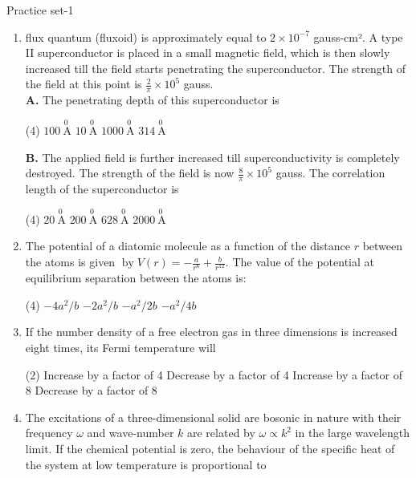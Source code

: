 \newpage
\begin{abox}
	Practice set-1
	\end{abox}
\begin{enumerate}
	\item flux quantum (fluxoid) is approximately equal to $2 \times 10^{-7}$ gauss-cm². A type II superconductor is placed in a small magnetic field, which is then slowly increased till the field starts penetrating the superconductor. The strength of the field at this point is $\frac{2}{\pi} \times 10^{5}$ gauss.\\
	\textbf{A. }The penetrating depth of this superconductor is
{	}
\begin{tasks}(4)
\task[\textbf{A.}] $100 \stackrel{0}{\mathrm{~A}}$ 
\task[\textbf{B.}] $10 \stackrel{0}{\mathrm{~A}}$
\task[\textbf{C.}] $1000 \stackrel{0}{\mathrm{~A}}$
\task[\textbf{D.}] $314 \stackrel{0}{\mathrm{~A}}$
\end{tasks}
\textbf{B.} The applied field is further increased till superconductivity is completely destroyed.
The strength of the field is now $\frac{8}{\pi} \times 10^{5}$ gauss. The correlation length of the superconductor is
\begin{tasks}(4)
	\task[\textbf{A.}] $20 \stackrel{0}{\mathrm{~A}}$
	\task[\textbf{B.}] $200 \stackrel{0}{\mathrm{~A}}$
	\task[\textbf{C.}] $628 \stackrel{0}{\mathrm{~A}}$
	\task[\textbf{D.}] $2000 \stackrel{0}{\mathrm{~A}}$
\end{tasks}
	\item The potential of a diatomic molecule as a function of the distance $r$ between the atoms is given $\operatorname{by} V(r)=-\frac{a}{r^{6}}+\frac{b}{r^{12}} .$ The value of the potential at equilibrium separation between the atoms is:
	{}
\begin{tasks}(4)
\task[\textbf{A.}] $-4 a^{2} / b$
\task[\textbf{B.}] $-2 a^{2} / b$
\task[\textbf{C.}] $-a^{2} / 2 b$
\task[\textbf{D.}] $-a^{2} / 4 b$
\end{tasks}
	\item If the number density of a free electron gas in three dimensions is increased eight times, its Fermi temperature will
	{}
\begin{tasks}(2)
\task[\textbf{A.}] Increase by a factor of 4
\task[\textbf{B.}]  Decrease by a factor of 4
\task[\textbf{C.}] Increase by a factor of 8
\task[\textbf{D.}]  Decrease by a factor of 8
\end{tasks}
	\item The excitations of a three-dimensional solid are bosonic in nature with their frequency $\omega$ and wave-number $k$ are related by $\omega \propto k^{2}$ in the large wavelength limit. If the chemical potential is zero, the behaviour of the specific heat of the system at low temperature is proportional to

\end{enumerate}
